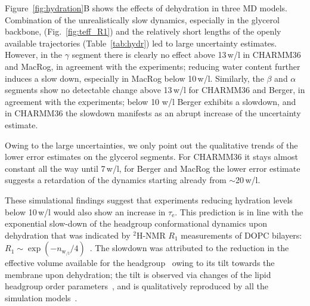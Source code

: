 \documentclass[journal=jpcbfk,manuscript=article,layout=twocolumn]{achemso}
\begin{document}
Figure~\ref{fig:hydration}B shows the effects of dehydration in three MD models.
Combination of
the unrealistically slow dynamics, especially in the glycerol backbone, (Fig.~\ref{fig:teff_R1}) and
the relatively short lengths of the openly available trajectories %
(Table~\ref{tab:hydr})
led to large uncertainty estimates. %
%
However, in the $\gamma$ segment
there is clearly no effect above 13\,w/l in CHARMM36 and MacRog,
in agreement with the experiments;
reducing water content further induces a slow down, 
especially in MacRog below 10\,w/l. 
%
Similarly, the
$\beta$ and $\alpha$ segments
show no detectable change above 13\,w/l
for CHARMM36 and Berger,
in agreement with the experiments;
below 10 w/l Berger exhibits a slowdown, and
in CHARMM36 the slowdown manifests as an abrupt increase of the uncertainty estimate.

Owing to the large uncertainties, we only point out the qualitative trends of the lower error estimates on the glycerol segments.
For CHARMM36 it stays almost constant all the way until 7\,w/l,
for Berger and MacRog the lower error estimate suggests a retardation of the dynamics starting already from $\sim$20\,w/l.

These simulational findings suggest that
experiments reducing hydration levels below 10\,w/l would also show an increase in $\tau_\mathrm e$.
This prediction is in line with the
exponential slow-down
of the headgroup conformational dynamics
upon dehydration that was indicated by $^2$H-NMR $R_{1}$ measurements
of DOPC bilayers:
$R_1\sim\exp(-n_{{\mathrm w\!}_{/\mathrm l}}/4)$~\cite{ulrich94}.
%
The slowdown was attributed to the reduction in the effective volume available for the headgroup~\cite{ulrich94}
owing to its tilt towards the membrane upon dehydration;
the tilt is observed via changes of the lipid headgroup order parameters~\cite{bechinger91},
and is qualitatively reproduced by all the simulation models~\cite{botan15}.

\end{document}

